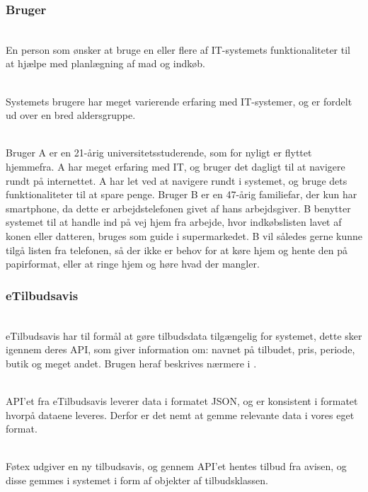 \subsubsection{Bruger}

\begin{description}[font=\normalfont\itshape]
\item[Formål]\hfill\\
En person som ønsker at bruge en eller flere af IT-systemets funktionaliteter til at hjælpe med planlægning af mad og indkøb.
\item[Karakteristik]\hfill\\
Systemets brugere har meget varierende erfaring med IT-systemer, og er fordelt ud over en bred aldersgruppe.
\item[Eksempler]\hfill\\
Bruger A er en 21-årig universitetsstuderende, som for nyligt er flyttet hjemmefra. A har meget erfaring med IT, og bruger det dagligt til at navigere rundt på internettet.
A har let ved at navigere rundt i systemet, og bruge dets funktionaliteter til at spare penge.
Bruger B er en 47-årig familiefar, der kun har smartphone, da dette er arbejdstelefonen givet af hans arbejdsgiver.
B benytter systemet til at handle ind på vej hjem fra arbejde, hvor indkøbslisten lavet af konen eller datteren, bruges som guide i supermarkedet.
B vil således gerne kunne tilgå listen fra telefonen, så der ikke er behov for at køre hjem og hente den på papirformat, eller at ringe hjem og høre hvad der mangler.
\end{description}

\subsubsection{eTilbudsavis}

\begin{description}[font=\normalfont\itshape]
\item[Formål]\hfill\\ 
eTilbudsavis har til formål at gøre tilbudsdata tilgængelig for systemet, dette sker igennem deres API, som giver information om: navnet på tilbudet, pris, periode, butik og meget andet. 
Brugen heraf beskrives nærmere i .
\item[Karakteristik]\hfill\\
API'et fra eTilbudsavis leverer data i formatet JSON, og er konsistent i formatet hvorpå dataene leveres. 
Derfor er det nemt at gemme relevante data i vores eget format.
\item[Eksempel]\hfill\\
Føtex udgiver en ny tilbudsavis, og gennem API'et hentes tilbud fra avisen, og disse gemmes i systemet i form af objekter af tilbudsklassen.
\end{description}

